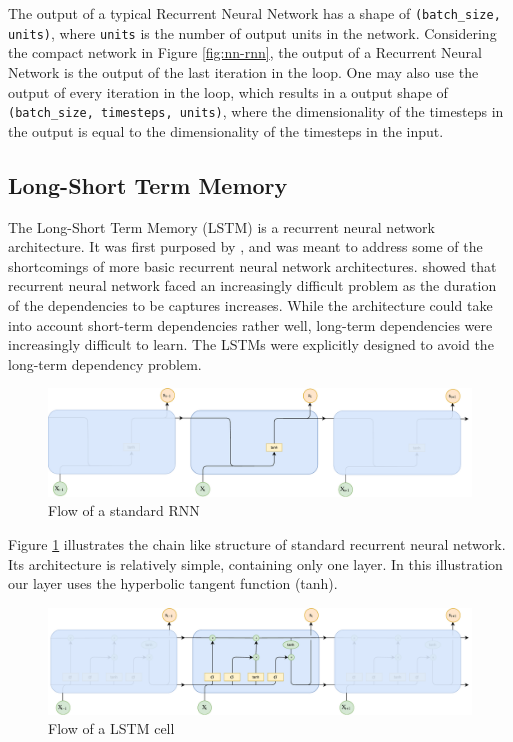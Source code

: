 The output of a typical Recurrent Neural Network has a shape of {\tt (batch\_size, units)}, where {\tt units} is the number of output units in the network. Considering the compact network in Figure \ref{fig:nn-rnn}, the output of a Recurrent Neural Network is the output of the last iteration in the loop. One may also use the output of every iteration in the loop, which results in a output shape of {\tt (batch\_size, timesteps, units)}, where the dimensionality of the timesteps in the output is equal to the dimensionality of the timesteps in the input.

\subsection{Long-Short Term Memory}
\label{sec:long_short_term_memory}
The Long-Short Term Memory (LSTM) is a recurrent neural network architecture. It was first purposed by \citep{hochreiter1997long}, and was meant to address some of the shortcomings of more basic recurrent neural network architectures. \citep{bengio1994learning} showed that recurrent neural network faced an increasingly difficult problem as the duration of the dependencies to be captures increases. While the architecture could take into account short-term dependencies rather well, long-term dependencies were increasingly difficult to learn. The LSTMs were explicitly designed to avoid the long-term dependency problem. 

\begin{figure}[ht]
    \centering
    \includegraphics[width=1\textwidth]{fig/related_work/rnn_flow.pdf}
    \caption{Flow of a standard RNN}
    \label{fig:nn-rnn-flow}
\end{figure}

Figure \ref{fig:nn-rnn-flow} illustrates the chain like structure of standard recurrent neural network. Its architecture is relatively simple, containing only one layer. In this illustration our layer uses the hyperbolic tangent function (tanh).

\begin{figure}[ht]
    \centering
    \includegraphics[width=1\textwidth]{fig/related_work/lstm_flow.pdf}
    \caption{Flow of a LSTM cell}
    \label{fig:nn-lstm-flow}
\end{figure}

